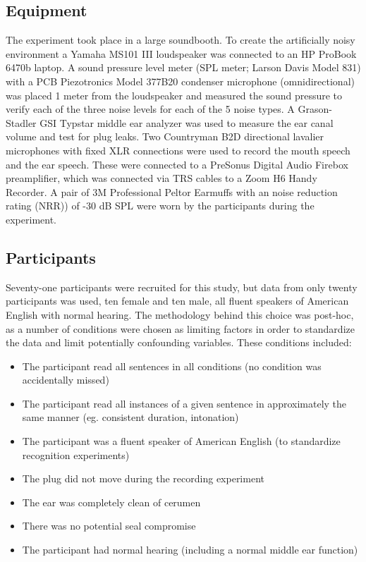   
\subsection{Equipment}

The experiment took place in a large soundbooth.  To create the artificially noisy environment a Yamaha MS101 III loudspeaker was connected to an HP ProBook 6470b laptop.  A sound pressure level meter (SPL meter; Larson Davis Model 831) with a PCB Piezotronics Model 377B20 condenser microphone (omnidirectional) was placed 1 meter from the loudspeaker and measured the sound pressure to verify each of the three noise levels for each of the 5 noise types. A Grason-Stadler GSI Typstar middle ear analyzer was used to measure the ear canal volume and test for plug leaks.  Two Countryman B2D directional lavalier microphones with fixed XLR connections were used to record the mouth speech and the ear speech.  These were connected to a PreSonus Digital Audio Firebox preamplifier, which was connected via TRS cables to a Zoom H6 Handy Recorder. A pair of 3M Professional Peltor Earmuffs with an noise reduction rating (NRR)) of -30 dB SPL were worn by the participants during the experiment.


\subsection{Participants}\label{chap2:methods:participants}
Seventy-one participants were recruited for this study, but data from only twenty participants was used, ten female and ten male, all fluent speakers of American English with normal hearing.  The methodology behind this choice was post-hoc, as a number of conditions were chosen as limiting factors in order to standardize the data and limit potentially confounding variables.  These conditions included:

\begin{itemize}
\item{The participant read all sentences in all conditions (no condition was accidentally missed)}
\item{The participant read all instances of a given sentence in approximately the same manner (eg. consistent duration, intonation)}
\item{The participant was a fluent speaker of American English (to standardize recognition experiments)}
\item{The plug did not move during the recording experiment}
\item{The ear was completely clean of cerumen}
\item{There was no potential seal compromise}
\item{The participant had normal hearing (including a normal middle ear function)}
\end{itemize}

